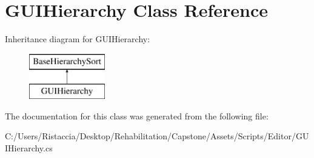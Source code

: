 \hypertarget{class_g_u_i_hierarchy}{}\section{G\+U\+I\+Hierarchy Class Reference}
\label{class_g_u_i_hierarchy}
Inheritance diagram for G\+U\+I\+Hierarchy\+:\begin{figure}[H]
\begin{center}
\leavevmode
\includegraphics[height=2.000000cm]{class_g_u_i_hierarchy}
\end{center}
\end{figure}


The documentation for this class was generated from the following file\+:\begin{DoxyCompactItemize}
\item 
C\+:/\+Users/\+Ristaccia/\+Desktop/\+Rehabilitation/\+Capstone/\+Assets/\+Scripts/\+Editor/G\+U\+I\+Hierarchy.\+cs\end{DoxyCompactItemize}
